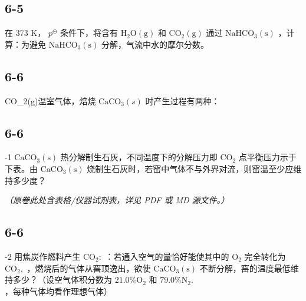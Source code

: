 \subsection*{6-5}
在 373 K， $p ^ { \ominus }$ 条件下，将含有 $\mathrm { H _ { 2 } O ( g ) }$ 和 $\mathrm { C O _ { 2 } ( g ) }$ 通过 $\mathrm { { N a H C O _ { 3 } ( s ) } }$ ，计算：为避免 $\mathrm { { N a H C O _ { 3 } ( s ) } }$ 分解，⽓流中⽔的摩尔分数。

\subsection*{6-6}
CO_{2}(g)温室⽓体，焙烧 $\mathrm { C a C O _ { 3 } } ( s )$ 时产⽣过程有两种：

\subsection*{6-6}
-1 $\mathrm { C a C O _ { 3 } ( s ) }$ 热分解制⽣⽯灰，不同温度下的分解压⼒即 $\mathrm { C O _ { 2 } }$ 点平衡压⼒⽰于下表。由 $\mathrm { C a C O _ { 3 } ( s ) }$ 烧制⽣⽯灰时，若窑中⽓体不与外界对流，则窑温⾄少应维持多少度？

\textit{（原卷此处含表格/仪器试剂表，详见 PDF 或 MD 源文件。）}

\subsection*{6-6}
-2 ⽤焦炭作燃料产⽣ $\mathrm { C O } _ { 2 } \mathrm { { : } }$ ：若通⼊空⽓的量恰好能使其中的 $\mathrm { O _ { 2 } }$ 完全转化为 $\mathrm { C O } _ { 2 } ,$ ，燃烧后的⽓体从窖顶逸出，欲使 $\mathrm { C a C O _ { 3 } ( s ) }$ 不断分解，窑的温度最低维持多少？（设空⽓体积分数为 $2 1 . 0 \% \mathrm { O } _ { 2 }$ 和 $7 9 . 0 \% \mathrm { N } _ { 2 } .$ ，每种⽓体均看作理想⽓体）

